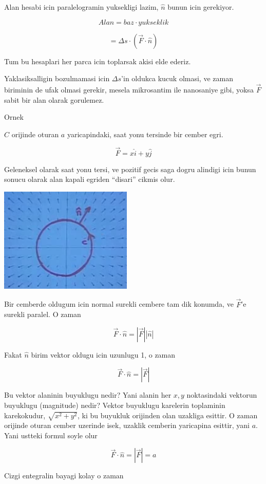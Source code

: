 \documentclass[12pt,fleqn]{article}
\begin{document}
Alan hesabi icin paralelogramin yuksekligi lazim, $\hat{n}$ bunun icin
gerekiyor. 

\[ Alan  = baz \cdot yukseklik \]

\[ = \Delta s \cdot (\vec{F} \cdot \hat{n} )\]

Tum bu hesaplari her parca icin toplarsak akisi elde ederiz. 

Yaklasiksalligin bozulmamasi icin $\Delta s$'in oldukca kucuk olmasi, ve
zaman biriminin de ufak olmasi gerekir, mesela mikrosantim ile nanosaniye
gibi, yoksa $\vec{F}$ sabit bir alan olarak gorulemez. 

Ornek

$C$ orijinde oturan $a$ yaricapindaki, saat yonu tersinde bir cember egri. 

\[ \vec{F} = x\hat{i} + y\hat{j} \]

Geleneksel olarak saat yonu tersi, ve pozitif gecis saga dogru alindigi
icin bunun sonucu olarak alan kapali egriden ``disari'' cikmis olur. 

\includegraphics[height=5cm]{23_6.png}

Bir cemberde oldugum icin normal surekli cembere tam dik konumda, ve
$\vec{F}$'e surekli paralel. O zaman 

\[ \vec{F} \cdot \hat{n} = |\vec{F}||\hat{n}| \]

Fakat $\hat{n}$ birim vektor oldugu icin uzunlugu 1, o zaman

\[ \vec{F} \cdot \hat{n} = |\vec{F}| \]

Bu vektor alaninin buyuklugu nedir? Yani alanin her $x,y$ noktasindaki
vektorun buyuklugu (magnitude) nedir? Vektor buyuklugu karelerin toplaminin
karekokudur, $\sqrt{x^2 + y^2}$, ki bu buyukluk orijinden olan uzakliga
esittir. O zaman orijinde oturan cember uzerinde isek, uzaklik cemberin
yaricapina esittir, yani $a$. Yani ustteki formul soyle olur

\[ \vec{F} \cdot \hat{n} = |\vec{F}| = a\]

Cizgi entegralin bayagi kolay o zaman
\end{document}
